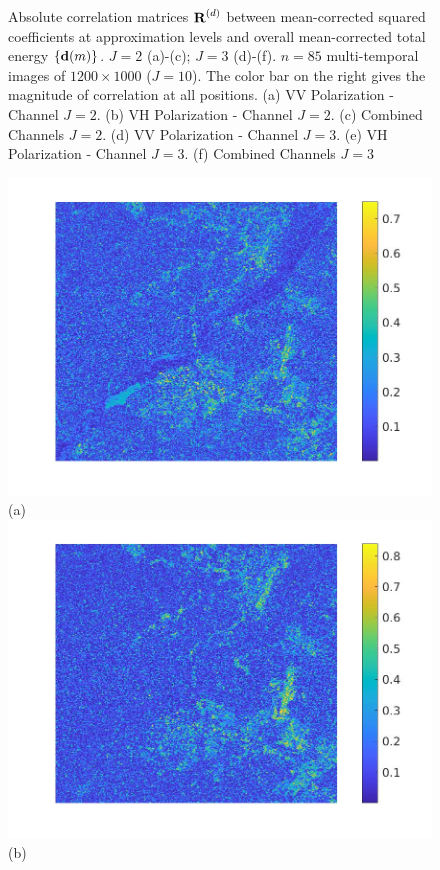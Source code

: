 \documentclass[journal]{IEEEtran}
\newcommand{\vd}{{\textbf d}}
\newcommand{\vR}{{\textbf R}}
\begin{document}
\begin{figure}[htp!]
\caption{Absolute correlation matrices $\vR^{(d)}$ between mean-corrected squared coefficients at approximation levels and overall mean-corrected total energy $\{\vd(m)\}$.  $J=2$ (a)-(c);  $J=3$ (d)-(f). $n=85$ multi-temporal images of $1200\times 1000$ ($J=10$). The color bar on the right gives the magnitude of correlation at all positions. (a) {\sc VV  Polarization - Channel} $J=2$. (b) {\sc VH  Polarization - Channel} $J=2$. (c) {\sc Combined Channels} $J=2$.  (d)  {\sc VV  Polarization - Channel} $J=3$. (e) {\sc VH  Polarization - Channel} $J=3$. (f) {\sc Combined Channels} $J=3$} 
\label{F:image_corr_J2J3}
\end{figure}

\begin{figure}[htp!]
\includegraphics[scale=.12]{../../figs/consecdif_J2_VV_image_cor}(a)
\includegraphics[scale=.12]{../../figs/consecdif_J2_VH_image_cor}(b)\\

\end{figure}
\end{document}
